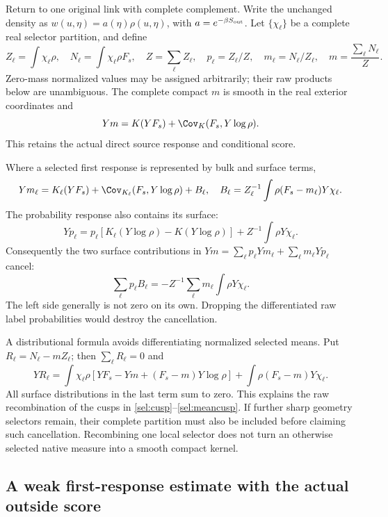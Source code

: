 Return to one original link with complete complement. Write the unchanged density as \(w(u,\eta)=a(\eta)\rho(u,\eta)\), with \(a=e^{-\beta S_{\rm out}}\). Let \(\{\chi_\ell\}\) be a complete real selector partition, and define
\[
 Z_\ell=\int\chi_\ell\rho,\quad N_\ell=\int\chi_\ell\rho F_s,\quad
 Z=\sum_\ell Z_\ell,\quad p_\ell=Z_\ell/Z,\quad
 m_\ell=N_\ell/Z_\ell,\quad m=\frac{\sum_\ell N_\ell}{Z}.
\]
Zero-mass normalized values may be assigned arbitrarily; their raw products below are unambiguous. The complete compact \(m\) is smooth in the real exterior coordinates and
\begin{equation}
 Ym=K(YF_s)+\Cov_K(F_s,Y\log\rho).
 \label{sel:meanresponse}
\end{equation}
This retains the actual direct source response and conditional score.

Where a selected first response is represented by bulk and surface terms,
\[
 Ym_\ell=K_\ell(YF_s)+\Cov_{K_\ell}(F_s,Y\log\rho)+B_\ell,
 \quad
 B_\ell=Z_\ell^{-1}\int\rho(F_s-m_\ell)Y\chi_\ell .
\]
The probability response also contains its surface:
\[
 Yp_\ell
 =p_\ell[K_\ell(Y\log\rho)-K(Y\log\rho)]
        +Z^{-1}\int\rho Y\chi_\ell .
\]
Consequently the two surface contributions in
\(Ym=\sum_\ell p_\ell Ym_\ell+\sum_\ell m_\ell Yp_\ell\) cancel:
\begin{equation}
 \sum_\ell p_\ell B_\ell
 =-Z^{-1}\sum_\ell m_\ell\int\rho Y\chi_\ell.
 \label{sel:surfacecancel}
\end{equation}
The left side generally is not zero on its own. Dropping the differentiated raw label probabilities would destroy the cancellation.

A distributional formula avoids differentiating normalized selected means. Put \(R_\ell=N_\ell-mZ_\ell\); then \(\sum_\ell R_\ell=0\) and
\begin{equation}
 YR_\ell
 =\int\chi_\ell\rho
       [YF_s-Ym+(F_s-m)Y\log\rho]
       +\int\rho(F_s-m)Y\chi_\ell .
 \label{sel:rawderivative}
\end{equation}
All surface distributions in the last term sum to zero. This explains the raw recombination of the cusps in \eqref{sel:cusp}--\eqref{sel:meancusp}. If further sharp geometry selectors remain, their complete partition must also be included before claiming such cancellation. Recombining one local selector does not turn an otherwise selected native measure into a smooth compact kernel.

\subsection{A weak first-response estimate with the actual outside score}


